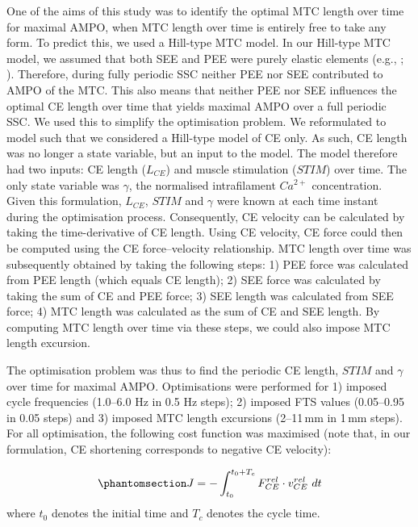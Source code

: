 \documentclass[
  11pt,
  a4paper]{article}
\begin{document}
One of the aims of this study was to identify the optimal MTC length
over time for maximal AMPO, when MTC length over time is entirely free
to take any form. To predict this, we used a Hill-type MTC model. In our
Hill-type MTC model, we assumed that both SEE and PEE were purely
elastic elements (e.g., ; ). Therefore, during fully periodic SSC neither PEE nor
SEE contributed to AMPO of the MTC. This also means that neither PEE nor
SEE influences the optimal CE length over time that yields maximal AMPO
over a full periodic SSC. We used this to simplify the optimisation
problem. We reformulated to model such that we considered a Hill-type
model of CE only. As such, CE length was no longer a state variable, but
an input to the model. The model therefore had two inputs: CE length
(\(L_{CE}\)) and muscle stimulation (\(STIM\)) over time. The only state
variable was \(\gamma\), the normalised intrafilament \(Ca^{2+}\)
concentration. Given this formulation, \(L_{CE}\), \(STIM\) and
\(\gamma\) were known at each time instant during the optimisation
process. Consequently, CE velocity can be calculated by taking the
time-derivative of CE length. Using CE velocity, CE force could then be
computed using the CE force--velocity relationship. MTC length over time
was subsequently obtained by taking the following steps: 1) PEE force
was calculated from PEE length (which equals CE length); 2) SEE force
was calculated by taking the sum of CE and PEE force; 3) SEE length was
calculated from SEE force; 4) MTC length was calculated as the sum of CE
and SEE length. By computing MTC length over time via these steps, we
could also impose MTC length excursion.

The optimisation problem was thus to find the periodic CE length,
\(STIM\) and \(\gamma\) over time for maximal AMPO. Optimisations were
performed for 1) imposed cycle frequencies (1.0--6.0 Hz in 0.5 Hz
steps); 2) imposed FTS values (0.05--0.95 in 0.05 steps) and 3) imposed
MTC length excursions (2--11\,mm in 1\,mm steps). For all optimisation,
the following cost function was maximised (note that, in our
formulation, CE shortening corresponds to negative CE velocity):

\begin{equation}\protect\phantomsection\label{eq-objective}{
J = -\int_{t_0}^{t_0+T_c} F_{CE}^{rel} \cdot v_{CE}^{rel} \ dt
}\end{equation} where \(t_0\) denotes the initial time and \(T_c\)
denotes the cycle time.
\end{document}
